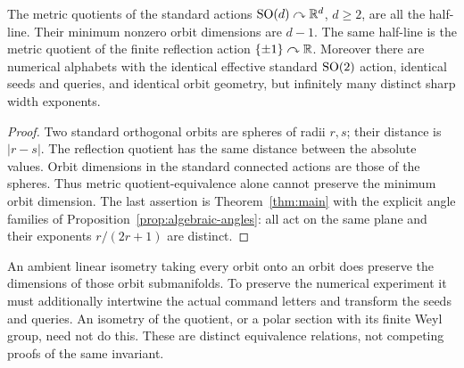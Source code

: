\begin{proposition}\label{prop:quotients}
The metric quotients of the standard actions $\operatorname{SO}(d)\curvearrowright\mathbb R^d$, $d\ge2$, are all the half-line. Their minimum nonzero orbit dimensions are $d-1$. The same half-line is the metric quotient of the finite reflection action $\{\pm1\}\curvearrowright\mathbb R$.
Moreover there are numerical alphabets with the identical effective standard $\operatorname{SO}(2)$ action, identical seeds and queries, and identical orbit geometry, but infinitely many distinct sharp width exponents.
\end{proposition}
\begin{proof}
Two standard orthogonal orbits are spheres of radii $r,s$; their distance is $|r-s|$. The reflection quotient has the same distance between the absolute values. Orbit dimensions in the standard connected actions are those of the spheres. Thus metric quotient-equivalence alone cannot preserve the minimum orbit dimension. The last assertion is Theorem~\ref{thm:main} with the explicit angle families of Proposition~\ref{prop:algebraic-angles}: all act on the same plane and their exponents $r/(2r+1)$ are distinct.
\end{proof}

An ambient linear isometry taking every orbit onto an orbit does preserve the dimensions of those orbit submanifolds. To preserve the numerical experiment it must additionally intertwine the actual command letters and transform the seeds and queries. An isometry of the quotient, or a polar section with its finite Weyl group, need not do this. These are distinct equivalence relations, not competing proofs of the same invariant.
